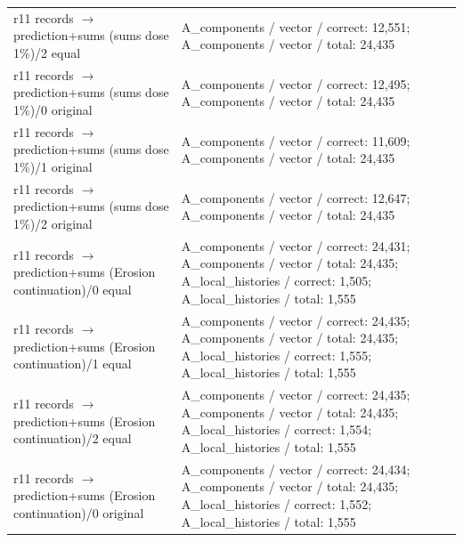 \begin{longtable}{@{}>{\raggedright\arraybackslash}p{1.800in}>{\raggedright\arraybackslash}p{4.200in}@{}}
r11 records $\to$ prediction+sums (sums dose 1\%)/\allowbreak{}2 equal & A\_\allowbreak{}components /\allowbreak{} vector /\allowbreak{} correct: 12,551; A\_\allowbreak{}components /\allowbreak{} vector /\allowbreak{} total: 24,435 \\
r11 records $\to$ prediction+sums (sums dose 1\%)/\allowbreak{}0 original & A\_\allowbreak{}components /\allowbreak{} vector /\allowbreak{} correct: 12,495; A\_\allowbreak{}components /\allowbreak{} vector /\allowbreak{} total: 24,435 \\
r11 records $\to$ prediction+sums (sums dose 1\%)/\allowbreak{}1 original & A\_\allowbreak{}components /\allowbreak{} vector /\allowbreak{} correct: 11,609; A\_\allowbreak{}components /\allowbreak{} vector /\allowbreak{} total: 24,435 \\
r11 records $\to$ prediction+sums (sums dose 1\%)/\allowbreak{}2 original & A\_\allowbreak{}components /\allowbreak{} vector /\allowbreak{} correct: 12,647; A\_\allowbreak{}components /\allowbreak{} vector /\allowbreak{} total: 24,435 \\
r11 records $\to$ prediction+sums (Erosion continuation)/\allowbreak{}0 equal & A\_\allowbreak{}components /\allowbreak{} vector /\allowbreak{} correct: 24,431; A\_\allowbreak{}components /\allowbreak{} vector /\allowbreak{} total: 24,435; A\_\allowbreak{}local\_\allowbreak{}histories /\allowbreak{} correct: 1,505; A\_\allowbreak{}local\_\allowbreak{}histories /\allowbreak{} total: 1,555 \\
r11 records $\to$ prediction+sums (Erosion continuation)/\allowbreak{}1 equal & A\_\allowbreak{}components /\allowbreak{} vector /\allowbreak{} correct: 24,435; A\_\allowbreak{}components /\allowbreak{} vector /\allowbreak{} total: 24,435; A\_\allowbreak{}local\_\allowbreak{}histories /\allowbreak{} correct: 1,555; A\_\allowbreak{}local\_\allowbreak{}histories /\allowbreak{} total: 1,555 \\
r11 records $\to$ prediction+sums (Erosion continuation)/\allowbreak{}2 equal & A\_\allowbreak{}components /\allowbreak{} vector /\allowbreak{} correct: 24,435; A\_\allowbreak{}components /\allowbreak{} vector /\allowbreak{} total: 24,435; A\_\allowbreak{}local\_\allowbreak{}histories /\allowbreak{} correct: 1,554; A\_\allowbreak{}local\_\allowbreak{}histories /\allowbreak{} total: 1,555 \\
r11 records $\to$ prediction+sums (Erosion continuation)/\allowbreak{}0 original & A\_\allowbreak{}components /\allowbreak{} vector /\allowbreak{} correct: 24,434; A\_\allowbreak{}components /\allowbreak{} vector /\allowbreak{} total: 24,435; A\_\allowbreak{}local\_\allowbreak{}histories /\allowbreak{} correct: 1,552; A\_\allowbreak{}local\_\allowbreak{}histories /\allowbreak{} total: 1,555 \\

\end{longtable}
